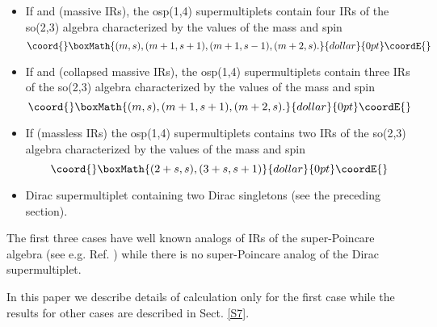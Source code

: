 \documentclass[a4paper,12pt]{article}%
\begin{document}
\begin{itemize}

\item If \coordHE{} and \coordHE{} (massive IRs), the osp(1,4)
supermultiplets contain four IRs of the so(2,3) algebra
characterized by the values of the mass and spin 
$$\coord{}\boxMath{(m,s),(m+1,s+1),(m+1,s-1),(m+2,s).}{dollar}{0pt}\coordE{}$$

\item If \coordHE{} and \coordHE{} (collapsed massive IRs), the osp(1,4)
supermultiplets contain three IRs of the so(2,3) algebra
characterized by the values of the mass and spin 
$$\coord{}\boxMath{(m,s),(m+1,s+1),(m+2,s).}{dollar}{0pt}\coordE{}$$

\item If \coordHE{} (massless IRs) the osp(1,4)
supermultiplets contains two IRs of the so(2,3) algebra
characterized by the values of the mass and spin 
$$\coord{}\boxMath{(2+s,s),(3+s,s+1)}{dollar}{0pt}\coordE{}$$

\item Dirac supermultiplet containing two Dirac
singletons (see the preceding section).   
\end{itemize}

The first three cases have well known analogs of IRs of the 
super-Poincare algebra (see e.g. Ref. \cite{Wein-super}) while
there is no super-Poincare analog of the Dirac supermultiplet.

In this paper we describe details of calculation only for the
first case while the results for other cases are described in 
Sect. \ref{S7}.
\end{document}
